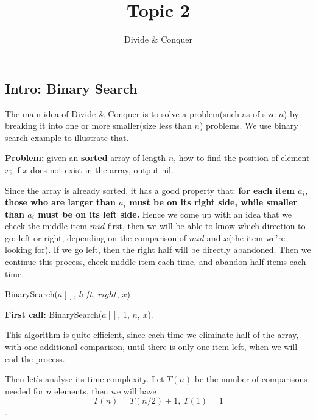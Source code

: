 \documentclass[11pt, a4paper]{COMP3711}
\title{Topic 2}
\subtitle{Divide \& Conquer}
\begin{document}
\begin{spacing}{1.5}
    
    \section{Intro: Binary Search}

    The main idea of {\rm Divide \& Conquer} is to solve a problem(such as of 
    size $n$) by breaking it into one or more smaller(size less than $n$) problems.
    We use binary search example to illustrate that.

    {\bf Problem:} given an {\bf sorted} array of length $n$, how to find 
    the position of element $x$; if $x$ does not exist
    in the array, output nil.

    Since the array is already sorted, it has a good property that:
    {\bf for each item $a_i$, those who are larger than $a_i$ must be 
    on its right side, while smaller than $a_i$ must be on its left side.}
    Hence we come up with an idea that we check the middle item $mid$ first,
    then we will be able to know which direction to go: left or right,
    depending on the comparison of $mid$ and $x$(the item we're looking for).
    If we go left, then the right half will be directly abandoned.
    Then we continue this process, check middle item each time, and 
    abandon half items each time.

    \begin{algorithm}
        \caption{BinarySearch($a[]$, $left$, $right$, $x$)}
    \end{algorithm}

    {\bf First call:} BinarySearch($a[]$, 1, $n$, $x$).

    This algorithm is quite efficient, since each time 
    we eliminate half of the array, with one additional 
    comparison, until there is only one item left,
    when we will end the process.

    Then let's analyse its time complexity. Let $T(n)$ be the number of 
    comparisons needed for $n$ elements, then we will have
    $$T(n)=T(n/2)+1,\ T(1)=1$$.


\end{spacing}
\end{document}
